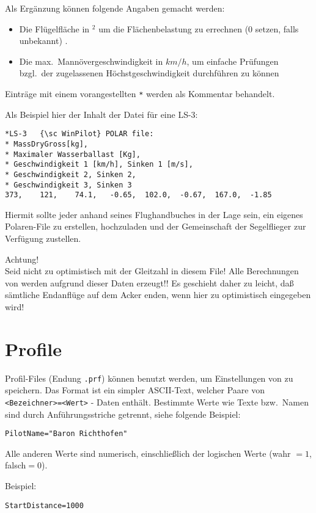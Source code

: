 {{{{Als Ergänzung können folgende Angaben gemacht werden:
\begin{itemize}
\item Die Flügelfläche in $^2$ um die Flächenbelastung zu errechnen  (0 setzen, falls unbekannt) .
\item Die max.\  Mannövergeschwindigkeit in $km/h$, um einfache Prüfungen bzgl.\
 der zugelassenen Höchstgeschwindigkeit durchführen zu können
\end{itemize}

Einträge mit einem vorangestellten \verb|*| werden als Kommentar behandelt.

Als Beispiel hier der Inhalt der Datei für eine LS-3:
\begin{verbatim}
*LS-3	{\sc WinPilot} POLAR file:
* MassDryGross[kg],
* Maximaler Wasserballast [Kg],
* Geschwindigkeit 1 [km/h], Sinken 1 [m/s],
* Geschwindigkeit 2, Sinken 2,
* Geschwindigkeit 3, Sinken 3  	
373,	121,	74.1,	-0.65,	102.0,	-0.67,	167.0,	-1.85
\end{verbatim}

Hiermit sollte jeder anhand seines Flughandbuches in der Lage sein, ein eigenes Polaren-File zu
erstellen, hochzuladen  und der Gemeinschaft der Segelflieger zur Verfügung zustellen.

Achtung!\\
Seid nicht zu optimistisch mit der Gleitzahl in diesem File!
\tip Alle Berechnungen von  \xc werden aufgrund dieser Daten erzeugt!!  Es geschieht daher zu
leicht, daß sämtliche Endanflüge auf dem Acker enden, wenn hier zu optimistisch
eingegeben wird!


\section{Profile}
Profil-Files (Endung \verb|.prf|) können benutzt werden, um Einstellungen von \xc zu speichern.
Das Format ist ein simpler ASCII-Text, welcher Paare von  \verb|<Bezeichner>=<Wert>|  - Daten enthält.
Bestimmte Werte wie Texte bzw.\ Namen sind durch Anführungsstriche getrennt, siehe folgende Beispiel:

\begin{verbatim}
PilotName="Baron Richthofen"
\end{verbatim}

Alle anderen Werte sind numerisch, einschließlich der logischen Werte (wahr $=1$, falsch$=0$).

Beispiel:


\begin{verbatim}
StartDistance=1000
\end{verbatim}

}}}}
